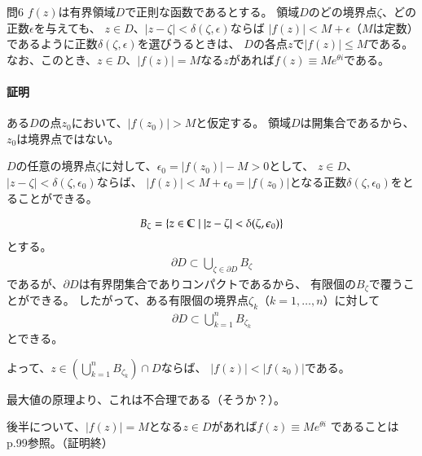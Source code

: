 \begin{mysimplebox}{問6}
    $f(z)$は有界領域$D$で正則な函数であるとする。
    領域$D$のどの境界点$\zeta$、どの正数$\epsilon$を与えても、
    $z\in D$、$|z-\zeta|<\delta(\zeta,\epsilon)$ならば
    $|f(z)|<M+\epsilon$（$M$は定数）であるように正数$\delta(\zeta,\epsilon)$を選びうるときは、
    $D$の各点$z$で$|f(z)|\le M$である。
    なお、このとき、$z\in D$、$|f(z)|=M$なる$z$があれば$f(z)\equiv Me^{\theta i}$である。
\end{mysimplebox}
\paragraph{証明}
ある$D$の点$z_0$において、$|f(z_0)|>M$と仮定する。
領域$D$は開集合であるから、$z_0$は境界点ではない。

$D$の任意の境界点$\zeta$に対して、$\epsilon_0=|f(z_0)|-M>0$として、
$z\in D$、$|z-\zeta|<\delta(\zeta,\epsilon_0)$ならば、
$|f(z)|<M+\epsilon_0=|f(z_0)|$となる正数$\delta(\zeta,\epsilon_0)$をとることができる。

\begin{align*}
    B_\zeta=\{z\in\mathbb{C}\mid|z-\zeta|<\delta(\zeta,\epsilon_0)\}
\end{align*}
とする。
\begin{align*}
    \partial D\subset\bigcup_{\zeta\in\partial D}B_\zeta
\end{align*}
であるが、$\partial D$は有界閉集合でありコンパクトであるから、
有限個の$B_\zeta$で覆うことができる。
したがって、ある有限個の境界点$\zeta_k$（$k=1,\dots,n$）に対して
\begin{align*}
    \partial D\subset\bigcup_{k=1}^{n}B_{\zeta_k}
\end{align*}
とできる。

よって、$z\in (\bigcup_{k=1}^{n}B_{\zeta_k})\cap D$ならば、
$|f(z)|<|f(z_0)|$である。

最大値の原理より、これは不合理である（そうか？）。

後半について、$|f(z)|=M$となる$z\in D$があれば$f(z)\equiv Me^{\theta i}$
であることはp.99参照。（証明終）

%
%
%
%
%
